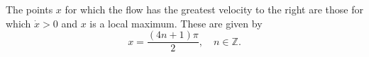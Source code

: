 
The points $x$ for which the flow has the greatest velocity to the
right are those
for which $\dot{x} > 0$ and $x$ is a local maximum. These are given by
\[
  x = \frac{(4n + 1)\pi}{2}, \quad n \in \mathbb{Z}.
\]
